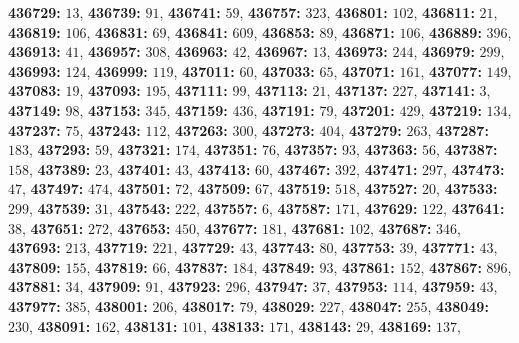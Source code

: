 \textsf{\bfseries 436729:} $13$, \textsf{\bfseries 436739:} $91$, \textsf{\bfseries 436741:} $59$, \textsf{\bfseries 436757:} $323$, \textsf{\bfseries 436801:} $102$, \textsf{\bfseries 436811:} $21$, \textsf{\bfseries 436819:} $106$, \textsf{\bfseries 436831:} $69$, \textsf{\bfseries 436841:} $609$, \textsf{\bfseries 436853:} $89$, \textsf{\bfseries 436871:} $106$, \textsf{\bfseries 436889:} $396$, \textsf{\bfseries 436913:} $41$, \textsf{\bfseries 436957:} $308$, \textsf{\bfseries 436963:} $42$, \textsf{\bfseries 436967:} $13$, \textsf{\bfseries 436973:} $244$, \textsf{\bfseries 436979:} $299$, \textsf{\bfseries 436993:} $124$, \textsf{\bfseries 436999:} $119$, \textsf{\bfseries 437011:} $60$, \textsf{\bfseries 437033:} $65$, \textsf{\bfseries 437071:} $161$, \textsf{\bfseries 437077:} $149$, \textsf{\bfseries 437083:} $19$, \textsf{\bfseries 437093:} $195$, \textsf{\bfseries 437111:} $99$, \textsf{\bfseries 437113:} $21$, \textsf{\bfseries 437137:} $227$, \textsf{\bfseries 437141:} $3$, \textsf{\bfseries 437149:} $98$, \textsf{\bfseries 437153:} $345$, \textsf{\bfseries 437159:} $436$, \textsf{\bfseries 437191:} $79$, \textsf{\bfseries 437201:} $429$, \textsf{\bfseries 437219:} $134$, \textsf{\bfseries 437237:} $75$, \textsf{\bfseries 437243:} $112$, \textsf{\bfseries 437263:} $300$, \textsf{\bfseries 437273:} $404$, \textsf{\bfseries 437279:} $263$, \textsf{\bfseries 437287:} $183$, \textsf{\bfseries 437293:} $59$, \textsf{\bfseries 437321:} $174$, \textsf{\bfseries 437351:} $76$, \textsf{\bfseries 437357:} $93$, \textsf{\bfseries 437363:} $56$, \textsf{\bfseries 437387:} $158$, \textsf{\bfseries 437389:} $23$, \textsf{\bfseries 437401:} $43$, \textsf{\bfseries 437413:} $60$, \textsf{\bfseries 437467:} $392$, \textsf{\bfseries 437471:} $297$, \textsf{\bfseries 437473:} $47$, \textsf{\bfseries 437497:} $474$, \textsf{\bfseries 437501:} $72$, \textsf{\bfseries 437509:} $67$, \textsf{\bfseries 437519:} $518$, \textsf{\bfseries 437527:} $20$, \textsf{\bfseries 437533:} $299$, \textsf{\bfseries 437539:} $31$, \textsf{\bfseries 437543:} $222$, \textsf{\bfseries 437557:} $6$, \textsf{\bfseries 437587:} $171$, \textsf{\bfseries 437629:} $122$, \textsf{\bfseries 437641:} $38$, \textsf{\bfseries 437651:} $272$, \textsf{\bfseries 437653:} $450$, \textsf{\bfseries 437677:} $181$, \textsf{\bfseries 437681:} $102$, \textsf{\bfseries 437687:} $346$, \textsf{\bfseries 437693:} $213$, \textsf{\bfseries 437719:} $221$, \textsf{\bfseries 437729:} $43$, \textsf{\bfseries 437743:} $80$, \textsf{\bfseries 437753:} $39$, \textsf{\bfseries 437771:} $43$, \textsf{\bfseries 437809:} $155$, \textsf{\bfseries 437819:} $66$, \textsf{\bfseries 437837:} $184$, \textsf{\bfseries 437849:} $93$, \textsf{\bfseries 437861:} $152$, \textsf{\bfseries 437867:} $896$, \textsf{\bfseries 437881:} $34$, \textsf{\bfseries 437909:} $91$, \textsf{\bfseries 437923:} $296$, \textsf{\bfseries 437947:} $37$, \textsf{\bfseries 437953:} $114$, \textsf{\bfseries 437959:} $43$, \textsf{\bfseries 437977:} $385$, \textsf{\bfseries 438001:} $206$, \textsf{\bfseries 438017:} $79$, \textsf{\bfseries 438029:} $227$, \textsf{\bfseries 438047:} $255$, \textsf{\bfseries 438049:} $230$, \textsf{\bfseries 438091:} $162$, \textsf{\bfseries 438131:} $101$, \textsf{\bfseries 438133:} $171$, \textsf{\bfseries 438143:} $29$, \textsf{\bfseries 438169:} $137$, 
